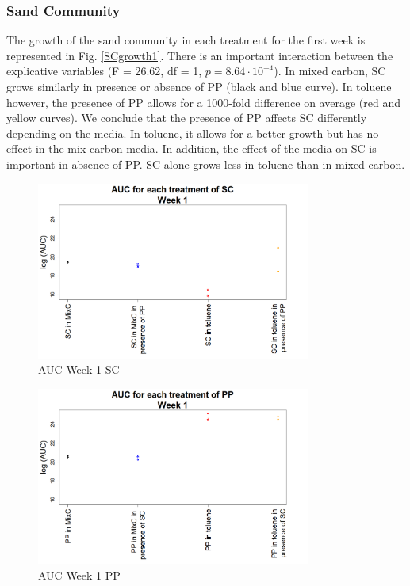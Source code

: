 \documentclass[a4paper, 10pt, conference]{ieeeconf}   %
\begin{document}
\subsubsection{Sand Community}
The growth of the sand community in each treatment for the first week is represented in Fig. \ref{SCgrowth1}.
There is an important interaction between the explicative variables (F = 26.62, df = 1, $p = 8.64\cdot 10 ^{-4}$).
In mixed carbon, SC grows similarly in presence or absence of PP (black and blue curve).
In toluene however, the presence of PP allows for a 1000-fold difference on average (red and yellow curves).
We conclude that the presence of PP affects SC differently depending on the media. In toluene, it allows for a better growth but has no effect in the mix carbon media. In addition, the effect of the media on SC is important in absence of PP. SC alone grows less in toluene than in mixed carbon.\newline
\begin{figure}[H]
	\centering
	\includegraphics[width=9cm]{AUCsc1.png}
	\caption{AUC Week 1 SC}
	\label{aucscw1}
\end{figure}

\begin{figure}[H]
	\centering
	\includegraphics[width=9cm]{AUCpp1.png}
	\caption{AUC Week 1 PP}
	\label{aucppw1}
\end{figure}
\end{document}
